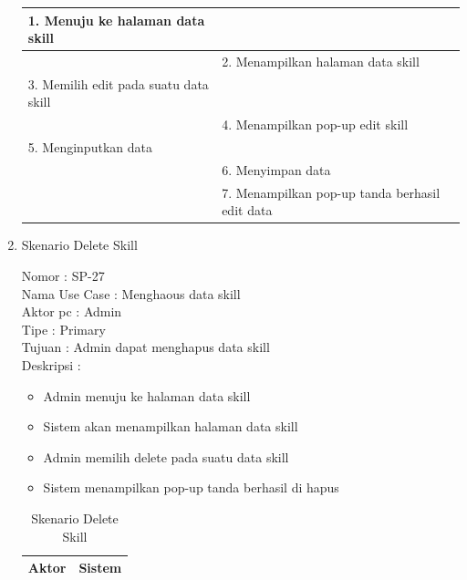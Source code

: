 \begin{enumerate}
\begin{table}
\begin{tabular}{ | l | p{60mm} |}
		1.	Menuju ke halaman data skill &  \\
		
		\hline
		
		&  2.	Menampilkan halaman data skill \\
		
		\hline
		
		3. Memilih edit pada suatu data skill & \\
		
		\hline
		
		& 4.	Menampilkan pop-up edit skill \\
		
		\hline
		
		5.	Menginputkan data  & \\
		\hline
		
		& 6.	Menyimpan data \\
		\hline
		
		& 7.	Menampilkan pop-up tanda berhasil edit data \\
		\hline
		
	\end{tabular}
\end{table}

\item Skenario Delete Skill

Nomor \kern 3.6pc : SP-27 \\
Nama Use Case : Menghaous data skill \\
Aktor  pc : Admin \\
Tipe \kern 4.6pc : Primary \\
Tujuan \kern 3.6pc : Admin dapat menghapus data skill \\
Deskripsi \kern 2.5pc : 

\begin{itemize}
	\item Admin menuju ke halaman data skill
	\item Sistem akan menampilkan halaman data skill
	\item Admin memilih delete pada suatu data skill
	\item Sistem menampilkan pop-up tanda berhasil di hapus
	
\end{itemize}

\begin{table}
	\caption{Skenario Delete Skill}
	\centering
	\begin{tabular}{ | l | p{60mm}|}
		\hline 
		\textbf{Aktor} & \textbf{Sistem} \\
		\hline
		

\end{tabular}
\end{table}
\end{enumerate}
